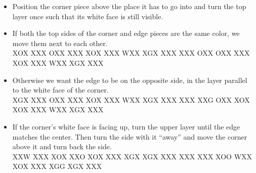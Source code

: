 \documentclass[9pt,dvipsnames]{extarticle}
\begin{document}
\begin{multicols*}{4}
\begin{itemize}
  \item Position the corner piece above the place it has to go into and turn the
        top layer once such that its white face is still visible.
  \item If both the top sides of the corner and edge pieces are the same color,
        we move them next to each other.\\[.2cm]
        \RubikFaceUp%
        {X}{O}{X}
        {X}{X}{X}
        {O}{X}{X}%
        \RubikFaceRight%
        {X}{X}{X}
        {X}{O}{X}
        {X}{X}{X}%
        \RubikFaceFront%
        {W}{X}{X}
        {X}{G}{X}
        {X}{X}{X}%
        \ShowCube{\cubesize}{\cubescale}{\DrawRubikCubeRU}%
        \RubikRotation{\fourspot}%
        \RubikFaceUp
        {X}{X}{X}
        {O}{X}{X}
        {O}{X}{X}%
        \RubikFaceRight%
        {X}{X}{X}
        {X}{O}{X}
        {X}{X}{X}%
        \RubikFaceFront%
        {W}{X}{X}
        {X}{G}{X}
        {X}{X}{X}%
        \ShowCube{\cubesize}{\cubescale}{\DrawRubikCubeRU}\\
        \item Otherwise we want the edge to be on the opposite side, in the layer
        parallel to the white face of the corner.\\[.2cm]
        \RubikFaceUp%
        {X}{G}{X}
        {X}{X}{X}
        {O}{X}{X}%
        \RubikFaceRight%
        {X}{X}{X}
        {X}{O}{X}
        {X}{X}{X}%
        \RubikFaceFront%
        {W}{X}{X}
        {X}{G}{X}
        {X}{X}{X}%
        \ShowCube{\cubesize}{\cubescale}{\DrawRubikCubeRU}%
        \RubikRotation{\fourspot}%
        \RubikFaceUp%
        {X}{X}{X}
        {X}{X}{G}
        {O}{X}{X}%
        \RubikFaceRight%
        {X}{O}{X}
        {X}{O}{X}
        {X}{X}{X}%
        \RubikFaceFront%
        {W}{X}{X}
        {X}{G}{X}
        {X}{X}{X}%
        \ShowCube{\cubesize}{\cubescale}{\DrawRubikCubeRU}\\[.3cm]
  \item If the corner's white face is facing up, turn the upper layer until the edge
matches the center. Then turn the side with it ``away'' and move
the corner above it and turn back the side.\\[.2cm]
\RubikFaceUp%
{X}{X}{W}
{X}{X}{X}
{X}{O}{X}%
\RubikFaceRight%
{X}{X}{O}
{X}{O}{X}
{X}{X}{X}%
\RubikFaceFront%
{X}{G}{X}
{X}{G}{X}
{X}{X}{X}%
\ShowCube{\cubesize}{\cubescale}{\DrawRubikCubeRU}%
\RubikRotation{\fourspot}%
%
\RubikUU%
%
\RubikFaceUp%
{X}{X}{X}
{X}{X}{X}
{X}{O}{O}%
\RubikFaceRight%
{W}{X}{X}
{X}{O}{X}
{X}{X}{X}%
\RubikFaceFront%
{X}{G}{G}
{X}{G}{X}
{X}{X}{X}%
\ShowCube{\cubesize}{\cubescale}{\DrawRubikCubeRU}
\end{itemize}


\end{multicols*}
\end{document}
